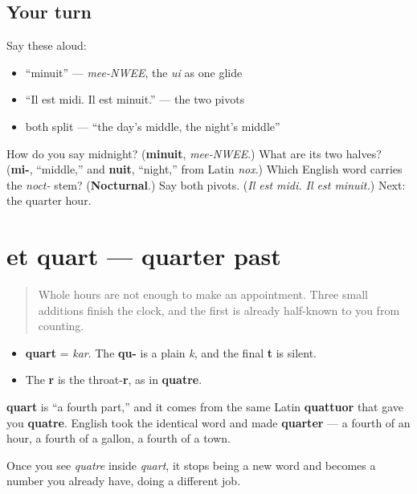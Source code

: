 \subsection*{Your turn}
Say these aloud:

\begin{itemize}
\raggedright
  \item \textquotedblleft{}minuit\textquotedblright{} — \emph{mee-NWEE}, the \emph{ui} as one glide
  \item \textquotedblleft{}Il est midi. Il est minuit.\textquotedblright{} — the two pivots
  \item both split — \textquotedblleft{}the day's middle, the night's middle\textquotedblright{}
\end{itemize}

\begin{tcolorbox}[breakable,colback=teal!4,colframe=teal!35!black,title={Before you move on}]
How do you say midnight? (\textbf{minuit}, \emph{mee-NWEE}.) What are its two halves? (\textbf{mi-}, \textquotedblleft{}middle,\textquotedblright{} and \textbf{nuit}, \textquotedblleft{}night,\textquotedblright{} from Latin \emph{nox}.) Which English word carries the \emph{noct-} stem? (\textbf{Nocturnal}.) Say both pivots. (\emph{Il est midi. Il est minuit.}) Next: the quarter hour.
\end{tcolorbox}
\section[et quart]{et quart — quarter past}

\label{lesson:FR-C08-quart}



\begin{quote}
Whole hours are not enough to make an appointment. Three small additions finish the clock, and the first is already half-known to you from counting.
\end{quote}

\begin{sounds}
\begin{itemize}
\raggedright
  \item \textbf{quart} = \emph{kar}. The \textbf{qu-} is a plain \emph{k}, and the final \textbf{t} is silent.
  \item The \textbf{r} is the throat-\textbf{r}, as in \textbf{quatre}.
\end{itemize}
\end{sounds}

\begin{cousinweb}
\textbf{quart} is \textquotedblleft{}a fourth part,\textquotedblright{} and it comes from the same Latin \textbf{quattuor} that gave you \textbf{quatre}. English took the identical word and made \textbf{quarter} — a fourth of an hour, a fourth of a gallon, a fourth of a town.

Once you see \emph{quatre} inside \emph{quart}, it stops being a new word and becomes a number you already have, doing a different job.
\end{cousinweb}

